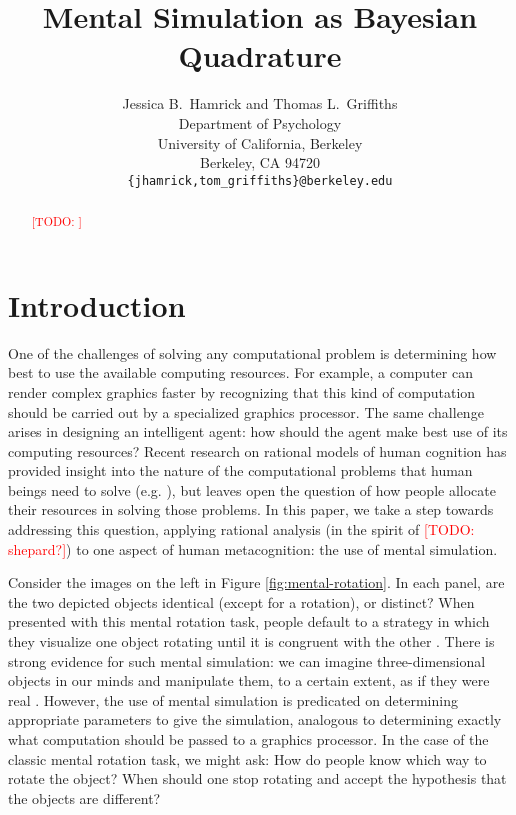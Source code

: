 \documentclass{article} %
\title{Mental Simulation as Bayesian Quadrature}
\author{Jessica B.~Hamrick and Thomas L.~Griffiths\\
  Department of Psychology\\
  University of California, Berkeley\\
  Berkeley, CA 94720\\
  \texttt{\{jhamrick,tom\_griffiths\}@berkeley.edu}}
\newcommand{\TODO}[1]{\textcolor{red}{[TODO: #1]}}
\begin{document}
\maketitle

\begin{abstract}
\TODO{}
\end{abstract}

\section{Introduction}

One of the challenges of solving any computational problem is
determining how best to use the available computing resources. For
example, a computer can render complex graphics faster by recognizing
that this kind of computation should be carried out by a specialized
graphics processor. The same challenge arises in designing an
intelligent agent: how should the agent make best use of its computing
resources? Recent research on rational models of human cognition has
provided insight into the nature of the computational problems that
human beings need to solve (e.g. \cite{Chater:1999wp,Griffiths2012a}),
but leaves open the question of how people allocate their resources in
solving those problems. In this paper, we take a step towards
addressing this question, applying rational analysis (in the spirit of
\cite{Marr:1983to,anderson90} \TODO{shepard?}) to one aspect of human
metacognition: the use of mental simulation.

Consider the images on the left in Figure
\ref{fig:mental-rotation}. In each panel, are the two depicted objects
identical (except for a rotation), or distinct? When presented with
this mental rotation task, people default to a strategy in which they
visualize one object rotating until it is congruent with the other
\cite{Shepard1971}. There is strong evidence for such mental
simulation: we can imagine three-dimensional objects in our minds and
manipulate them, to a certain extent, as if they were real
\cite{Kosslyn:2009tj}.  However, the use of mental simulation is
predicated on determining appropriate parameters to give the
simulation, analogous to determining exactly what computation should
be passed to a graphics processor.  In the case of the classic mental
rotation task, we might ask: How do people know which way to rotate
the object?  When should one stop rotating and accept the hypothesis
that the objects are different?
\end{document}
